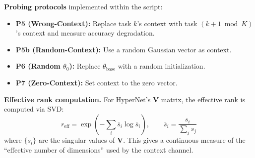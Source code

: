 \documentclass{article}
\begin{document}
\textbf{Probing protocols} implemented within the script:
\begin{itemize}
    \item \textbf{P5 (Wrong-Context):} Replace task $k$'s context with task $(k+1 \bmod K)$'s context and measure accuracy degradation.
    \item \textbf{P5b (Random-Context):} Use a random Gaussian vector as context.
    \item \textbf{P6 (Random $\theta_0$):} Replace $\theta_\mathrm{base}$ with a random initialization.
    \item \textbf{P7 (Zero-Context):} Set context to the zero vector.
\end{itemize}

\textbf{Effective rank computation.}
For HyperNet's $\mathbf{V}$ matrix, the effective rank is computed via SVD:
\begin{equation}
    r_\mathrm{eff} = \exp\left(-\sum_i \bar{s}_i \log \bar{s}_i\right), \qquad \bar{s}_i = \frac{s_i}{\sum_j s_j}
\end{equation}
where $\{s_i\}$ are the singular values of $\mathbf{V}$. This gives a continuous measure of the ``effective number of dimensions'' used by the context channel.
\end{document}

